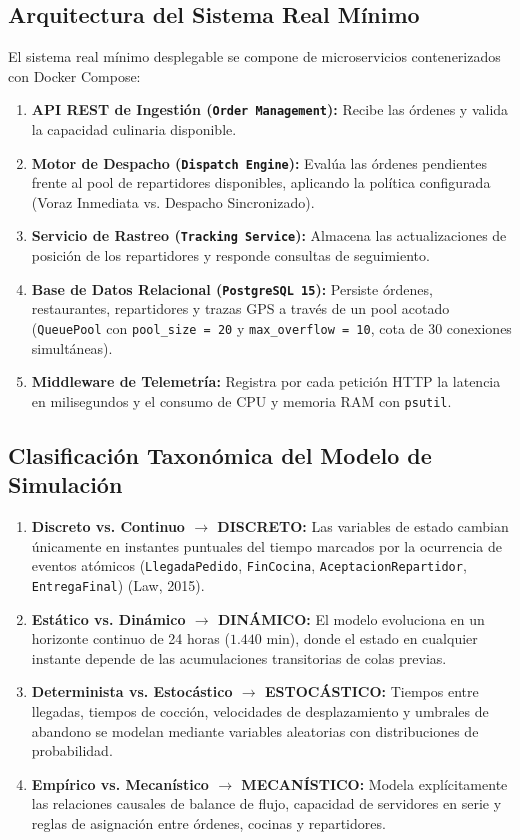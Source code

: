 \documentclass[11pt,letterpaper]{article}
\begin{document}
\subsection{Arquitectura del Sistema Real Mínimo}
El sistema real mínimo desplegable se compone de microservicios contenerizados con Docker Compose:
\begin{enumerate}[leftmargin=1.5em, itemsep=0.2em]
    \item \textbf{API REST de Ingestión (\texttt{Order Management}):} Recibe las órdenes y valida la capacidad culinaria disponible.
    \item \textbf{Motor de Despacho (\texttt{Dispatch Engine}):} Evalúa las órdenes pendientes frente al pool de repartidores disponibles, aplicando la política configurada (Voraz Inmediata vs. Despacho Sincronizado).
    \item \textbf{Servicio de Rastreo (\texttt{Tracking Service}):} Almacena las actualizaciones de posición de los repartidores y responde consultas de seguimiento.
    \item \textbf{Base de Datos Relacional (\texttt{PostgreSQL 15}):} Persiste órdenes, restaurantes, repartidores y trazas GPS a través de un pool acotado (\texttt{QueuePool} con \texttt{pool\_size = 20} y \texttt{max\_overflow = 10}, cota de 30 conexiones simultáneas).
    \item \textbf{Middleware de Telemetría:} Registra por cada petición HTTP la latencia en milisegundos y el consumo de CPU y memoria RAM con \texttt{psutil}.
\end{enumerate}

\subsection{Clasificación Taxonómica del Modelo de Simulación}
\begin{enumerate}[leftmargin=1.5em, itemsep=0.2em]
    \item \textbf{Discreto vs. Continuo $\rightarrow$ DISCRETO:} Las variables de estado cambian únicamente en instantes puntuales del tiempo marcados por la ocurrencia de eventos atómicos (\texttt{LlegadaPedido}, \texttt{FinCocina}, \texttt{AceptacionRepartidor}, \texttt{EntregaFinal}) (Law, 2015).
    \item \textbf{Estático vs. Dinámico $\rightarrow$ DINÁMICO:} El modelo evoluciona en un horizonte continuo de 24 horas ($1.440\text{ min}$), donde el estado en cualquier instante depende de las acumulaciones transitorias de colas previas.
    \item \textbf{Determinista vs. Estocástico $\rightarrow$ ESTOCÁSTICO:} Tiempos entre llegadas, tiempos de cocción, velocidades de desplazamiento y umbrales de abandono se modelan mediante variables aleatorias con distribuciones de probabilidad.
    \item \textbf{Empírico vs. Mecanístico $\rightarrow$ MECANÍSTICO:} Modela explícitamente las relaciones causales de balance de flujo, capacidad de servidores en serie y reglas de asignación entre órdenes, cocinas y repartidores.
\end{enumerate}
\end{document}
